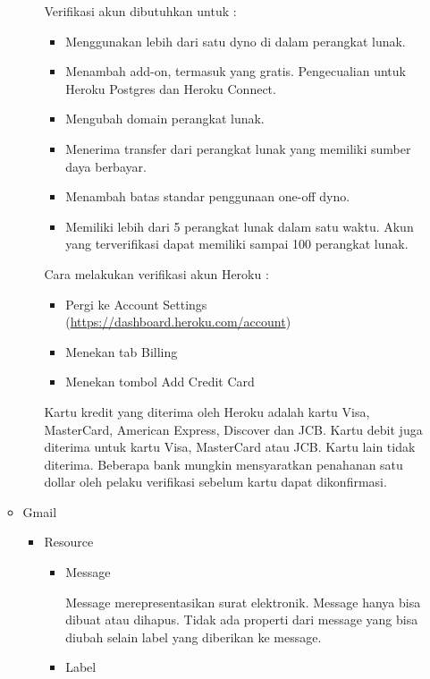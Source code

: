 \documentclass[a4paper,twoside]{article}
\begin{document}
\begin{enumerate}
\begin{itemize}
\begin{itemize}
			Verifikasi akun dibutuhkan untuk :
			\begin{itemize}
				\item Menggunakan lebih dari satu dyno di dalam perangkat lunak.
				\item Menambah add-on, termasuk yang gratis. Pengecualian untuk Heroku Postgres dan Heroku Connect.
				\item Mengubah domain perangkat lunak.
				\item Menerima transfer dari perangkat lunak yang memiliki sumber daya berbayar.
				\item Menambah batas standar penggunaan one-off dyno.
				\item Memiliki lebih dari 5 perangkat lunak dalam satu waktu.  Akun yang terverifikasi dapat memiliki sampai 100 perangkat lunak.
			\end{itemize}

			Cara melakukan verifikasi akun Heroku :
			\begin{itemize}
				\item Pergi ke Account Settings (\url{https://dashboard.heroku.com/account})
				\item Menekan tab Billing
				\item Menekan tombol Add Credit Card
			\end{itemize}

			Kartu kredit yang diterima oleh Heroku adalah kartu Visa, MasterCard, American Express, Discover dan JCB. Kartu debit juga diterima untuk kartu Visa, MasterCard atau JCB. Kartu lain tidak diterima. Beberapa bank mungkin mensyaratkan penahanan satu dollar oleh pelaku verifikasi sebelum kartu dapat dikonfirmasi.
		
		\end{itemize}
		
		\item Gmail		
		
		\begin{itemize}
			\item Resource
			
			\begin{itemize}
				\item Message
				
				Message merepresentasikan surat elektronik. Message hanya bisa dibuat atau dihapus. Tidak ada properti dari message yang bisa diubah selain label yang diberikan ke message.
				
				\item Label
				

\end{itemize}
\end{itemize}
\end{itemize}
\end{enumerate}
\end{document}

